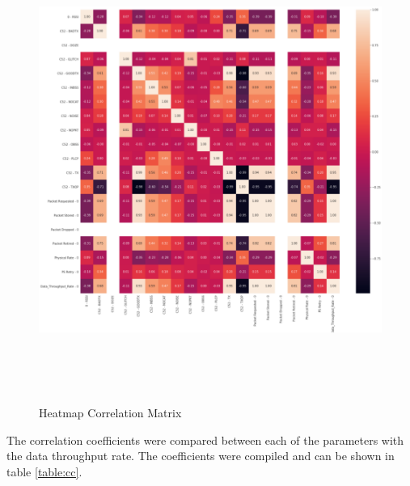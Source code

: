 \begin{figure}[ht]
    \centering
    \includegraphics[width=14.5cm,height=15.2cm,keepaspectratio]{pages/Chapter4/Chapter 4 Images/Cmatrix.PNG}
    \caption{Heatmap Correlation Matrix}
    \label{fig_Cmatrix}
\end{figure}

The correlation coefficients were compared between each of the parameters with the data throughput rate. The coefficients were compiled and can be shown in table \ref{table:cc}. 

